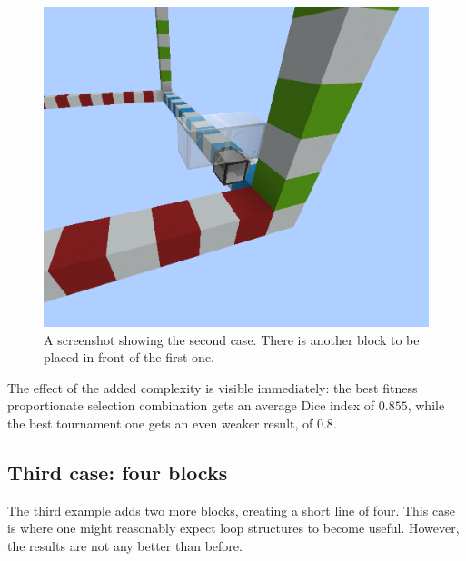 \documentclass{report}
\begin{document}
\begin{figure}[H]
    \centering
    \includegraphics[scale=0.3]{minecraft3}
    \caption{A screenshot showing the second case. There is another block to be placed in front of the first one.}
\end{figure}

The effect of the added complexity is visible immediately: the best fitness proportionate selection combination gets an average Dice index of $0.855$, while the best tournament one gets an even weaker result, of $0.8$.

\subsection{Third case: four blocks}

The third example adds two more blocks, creating a short line of four. This case is where one might reasonably expect loop structures to become useful. However, the results are not any better than before.
\end{document}
